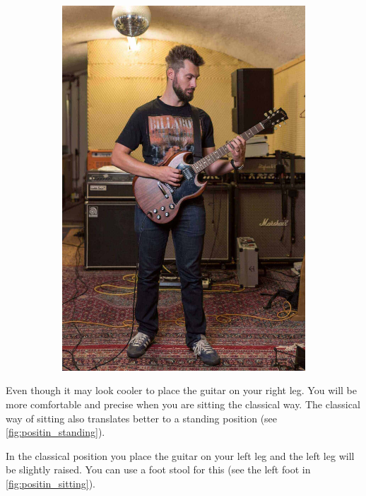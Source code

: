 \begin{figure}[h]
\begin{subfigure}[b]{0.45\textwidth}
    \includegraphics[width=\textwidth]{../../Images/Letty_Guitar-Shooting_standing.jpg}
    \caption{}
    \label{fig:positin_standing}
  \end{subfigure}
  \caption{\cite{SitStandPosition}}
  \label{fig:positin}
\end{figure}


Even though it may look cooler to place the guitar on your right leg. You will be more comfortable and precise when you are sitting the classical way. The classical way of sitting also translates better to a standing position (see \autoref{fig:positin_standing}).

In the classical position you place the guitar on your left leg and the left leg will be slightly raised. You can use a foot stool for this (see the left foot in \autoref{fig:positin_sitting}).